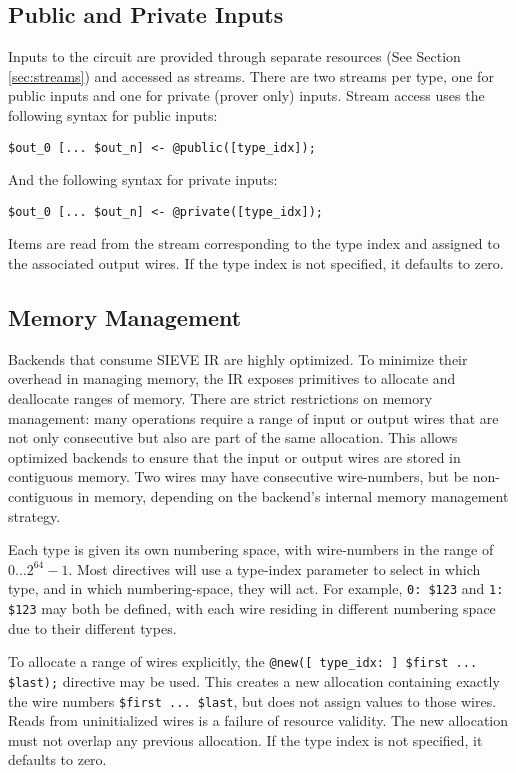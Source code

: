 \subsection{Public and Private Inputs}
Inputs to the circuit are provided through separate resources (See Section \ref{sec:streams}) and accessed as streams.
There are two streams per type, one for public inputs and one for private (prover only) inputs.
%
Stream access uses the following syntax for public inputs:
\begin{lstlisting}[language=ir]
$out_0 [... $out_n] <- @public([type_idx]);
\end{lstlisting}
And the following syntax for private inputs:
\begin{lstlisting}[language=ir]
$out_0 [... $out_n] <- @private([type_idx]);
\end{lstlisting}
Items are read from the stream corresponding to the type index and assigned to
the associated output wires. If the type index is not specified, it defaults to
zero.

\subsection{Memory Management}

Backends that consume SIEVE IR are highly optimized.
To minimize their overhead in managing memory, the IR exposes primitives to allocate and deallocate ranges of memory.
There are strict restrictions
on memory management: many operations require a range of input or output wires
that are not only consecutive but also are part of the same allocation.
This allows optimized backends to ensure that the input or output wires are
stored in contiguous memory.
Two wires may have consecutive wire-numbers, but be non-contiguous in memory,
depending on the backend's internal memory management strategy.

Each type is given its own numbering space, with wire-numbers in the range of $0 ... 2^{64}-1$.
Most directives will use a type-index parameter to select in which type, and in which numbering-space, they will act.
For example, \texttt{0: \$123} and \texttt{1: \$123} may both be defined, with each wire residing in different numbering space due to their different types.

To allocate a range of wires explicitly, the \texttt{@new([ type\_idx: ] \$first ... \$last);} directive may be used.
This creates a new allocation containing exactly the wire numbers \texttt{\$first ... \$last},
but does not assign values to those wires.
Reads from uninitialized wires is a failure of resource validity.
The new allocation must not overlap any previous allocation.
If the type index is not specified, it defaults to zero.


